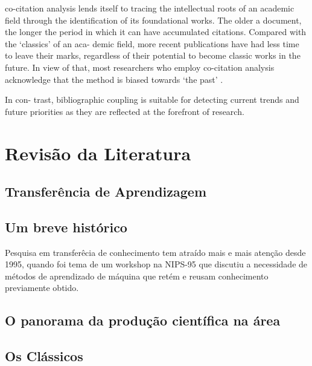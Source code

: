 \documentclass[sigconf]{acmart}
\begin{document}
 co-citation analysis lends itself to tracing the intellectual roots of an academic field through the identification of its foundational works. The older a document, the longer the period in which it can have accumulated citations. Compared with the ‘classics’ of an aca- demic field, more recent publications have had less time to leave their marks, regardless of their potential to become classic works in the future. In view of that, most researchers who employ co-citation analysis acknowledge that the method is biased towards ‘the past’ .
  
  In con- trast, bibliographic coupling is suitable for detecting current trends and future priorities as they are reflected at the forefront of research.
\section{Revisão da Literatura}
  \subsection{Transferência de Aprendizagem}
  \lipsum[3]
  \subsection{Um breve histórico}
  Pesquisa em transferêcia de conhecimento tem atraído mais e mais atenção desde 1995, quando foi tema de  um workshop na NIPS-95 que discutiu a necessidade de métodos de aprendizado de máquina que retém e reusam conhecimento previamente obtido\cite{sinno}. 
  \lipsum[2]
  \subsection{O panorama da produção científica na área}\label{sec:panorama}
  \lipsum[1]
  
  

 
  \subsection{Os Clássicos}
\end{document}
